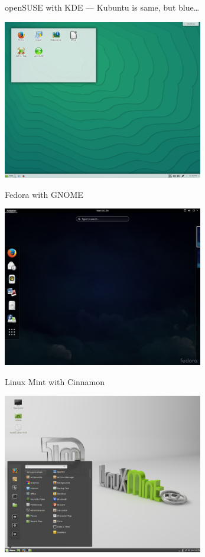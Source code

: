 \documentclass[compress, ucs, xelatex, 11pt, xcolor=svgnames,
  hyperref={
    bookmarks=true,
    unicode=true,
    colorlinks=true,
    pdftitle={Linux, command line and MetaCentrum},
    plainpages=false,
    pdfauthor={Vojtech Zeisek},
    pdfsubject={Course about use of Linux command line, writing shell scripts and using MetaCentrum of CESNET},
    pdfcreator={XeLaTeX, http://www.xelatex.org/},
    pdfkeywords={Linux, GNU, BASH, shell, command line, MetaCentrum},
    linkcolor=Sienna,
    anchorcolor=black,
    citecolor=green,
    filecolor=magenta,
    menucolor=Sienna,
    urlcolor=cyan,
    pdftex},
  url={hyphens, lowtilde} %
  ]{beamer}
\begin{document}
\begin{frame}{openSUSE with KDE --- Kubuntu is same, but blue\ldots}
\begin{center}
  \includegraphics[height=7cm]{opensuse.png}
\end{center}
\end{frame}

\begin{frame}{Fedora with GNOME}
\begin{center}
  \includegraphics[height=7cm]{fedora.png}
\end{center}
\end{frame}

\begin{frame}{Linux Mint with Cinnamon}
\begin{center}
  \includegraphics[height=7cm]{mint.png}
\end{center}
\end{frame}
\end{document}
